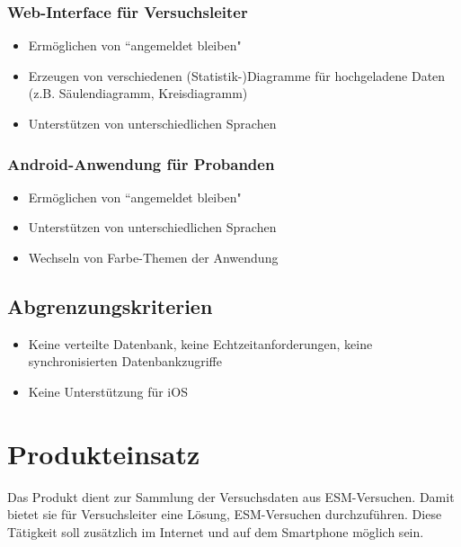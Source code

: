 \documentclass[a4paper]{scrreprt}
\begin{document}
            \subsection{\gls{Web-Interface} f\"ur \gls{Versuchsleiter}}
                \begin{itemize}
                    \item Erm\"oglichen von ``angemeldet bleiben"
                    \item Erzeugen von verschiedenen (Statistik-)Diagramme f\"ur hochgeladene Daten (z.B. S\"aulendiagramm, Kreisdiagramm)
                    \item Unterst\"utzen von unterschiedlichen Sprachen

                \end{itemize}

            \subsection{Android-Anwendung f\"ur \gls{Proband}en}
                \begin{itemize}
                    \item Erm\"oglichen von ``angemeldet bleiben"
                    \item Unterst\"utzen von unterschiedlichen Sprachen
                    \item Wechseln von Farbe-Themen der Anwendung
                \end{itemize}
                \vspace*{0.5cm}


        \section{Abgrenzungskriterien}
            \begin{itemize}
                \item Keine verteilte Datenbank, keine Echtzeitanforderungen, keine synchronisierten Datenbankzugriffe
                \item Keine Unterst\"utzung f\"ur iOS
            \end{itemize}

    \chapter{Produkteinsatz}
        Das Produkt dient zur Sammlung der Versuchsdaten aus ESM-Versuchen. Damit bietet sie für \gls{Versuchsleiter} eine Lösung, ESM-Versuchen durchzuführen. Diese Tätigkeit soll zusätzlich im Internet und auf dem Smartphone möglich sein.
\end{document}
